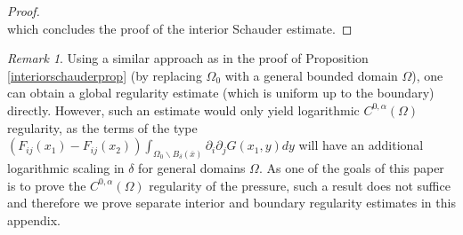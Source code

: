 \documentclass[12pt,a4paper]{article}
\theoremstyle{definition}
\theoremstyle{remark}
\newtheorem{remark}[theorem]{Remark}
\numberwithin{equation}{section}
\begin{document}
\begin{appendices}
\begin{proof}
\begin{equation*}
\end{equation*}
which concludes the proof of the interior Schauder estimate.
\end{proof}
\begin{remark}
Using a similar approach as in the proof of Proposition \ref{interiorschauderprop} (by replacing $\Omega_0$ with a general bounded domain $\Omega$), one can obtain a global regularity estimate (which is uniform up to the boundary) directly. However, such an estimate would only yield logarithmic $C^{0,\alpha} (\Omega)$ regularity, as the terms of the type $(F_{ij} (x_1) - F_{ij} (x_2)) \int_{\Omega_0 \backslash B_\delta (\overline{x})} \partial_i \partial_{j} G(x_1, y) dy$ will have an additional logarithmic scaling in $\delta$ for general domains $\Omega$. As one of the goals of this paper is to prove the $C^{0,\alpha} (\Omega)$ regularity of the pressure, such a result does not suffice and therefore we prove separate interior and boundary regularity estimates in this appendix.
\end{remark}


\end{appendices}
\end{document}

